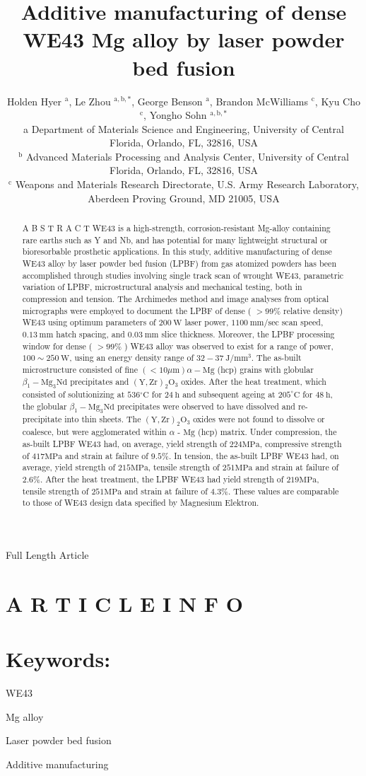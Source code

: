 \documentclass[10pt]{article}
\title{Additive manufacturing of dense WE43 Mg alloy by laser powder bed fusion }
\author{Holden Hyer ${ }^{\mathrm{a}}$, Le Zhou ${ }^{\mathrm{a}, \mathrm{b}, *}$, George Benson ${ }^{\mathrm{a}}$, Brandon McWilliams ${ }^{\mathrm{c}}$, Kyu Cho ${ }^{\mathrm{c}}$, Yongho Sohn ${ }^{\mathrm{a}, \mathrm{b}, *}$\\
a Department of Materials Science and Engineering, University of Central Florida, Orlando, FL, 32816, USA\\
${ }^{\mathrm{b}}$ Advanced Materials Processing and Analysis Center, University of Central Florida, Orlando, FL, 32816, USA\\
${ }^{\mathrm{c}}$ Weapons and Materials Research Directorate, U.S. Army Research Laboratory, Aberdeen Proving Ground, MD 21005, USA}
\date{}
\begin{document}
\maketitle
Full Length Article



\section*{A R T I C L E I N F O}
\section*{Keywords:}
WE43

Mg alloy

Laser powder bed fusion

Additive manufacturing

\begin{abstract}
A B S T R A C T WE43 is a high-strength, corrosion-resistant Mg-alloy containing rare earths such as Y and Nb, and has potential for many lightweight structural or bioresorbable prosthetic applications. In this study, additive manufacturing of dense WE43 alloy by laser powder bed fusion (LPBF) from gas atomized powders has been accomplished through studies involving single track scan of wrought WE43, parametric variation of LPBF, microstructural analysis and mechanical testing, both in compression and tension. The Archimedes method and image analyses from optical micrographs were employed to document the LPBF of dense ( $>99 \%$ relative density) WE43 using optimum parameters of $200 \mathrm{~W}$ laser power, $1100 \mathrm{~mm} / \mathrm{sec}$ scan speed, $0.13 \mathrm{~mm}$ hatch spacing, and $0.03 \mathrm{~mm}$ slice thickness. Moreover, the LPBF processing window for dense ( $>99 \%$ ) WE43 alloy was observed to exist for a range of power, $100 \sim 250 \mathrm{~W}$, using an energy density range of $32-37 \mathrm{~J} / \mathrm{mm}^{3}$. The as-built microstructure consisted of fine $(<10 \mu \mathrm{m}) \alpha-\mathrm{Mg}$ (hcp) grains with globular $\beta_{1}-\mathrm{Mg}_{3} \mathrm{Nd}$ precipitates and $(\mathrm{Y}, \mathrm{Zr})_{2} \mathrm{O}_{3}$ oxides. After the heat treatment, which consisted of solutionizing at $536{ }^{\circ} \mathrm{C}$ for $24 \mathrm{~h}$ and subsequent ageing at $205^{\circ} \mathrm{C}$ for $48 \mathrm{~h}$, the globular $\beta_{1}-\mathrm{Mg}_{3} \mathrm{Nd}$ precipitates were observed to have dissolved and re-precipitate into thin sheets. The $(\mathrm{Y}, \mathrm{Zr})_{2} \mathrm{O}_{3}$ oxides were not found to dissolve or coalesce, but were agglomerated within $\alpha$ - $\mathrm{Mg}$ (hcp) matrix. Under compression, the as-built LPBF WE43 had, on average, yield strength of $224 \mathrm{MPa}$, compressive strength of $417 \mathrm{MPa}$ and strain at failure of $9.5 \%$. In tension, the as-built LPBF WE43 had, on average, yield strength of $215 \mathrm{MPa}$, tensile strength of $251 \mathrm{MPa}$ and strain at failure of $2.6 \%$. After the heat treatment, the LPBF WE43 had yield strength of $219 \mathrm{MPa}$, tensile strength of $251 \mathrm{MPa}$ and strain at failure of $4.3 \%$. These values are comparable to those of WE43 design data specified by Magnesium Elektron.
\end{abstract}
\end{document}
